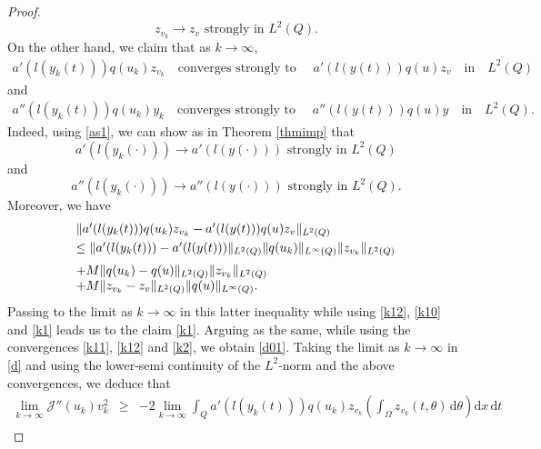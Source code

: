 \documentclass[reqno,twoside]{amsart}
\numberwithin{equation}{section}
\theoremstyle{definition}
\numberwithin{equation}{section}
\def \dis {\displaystyle}
\def \dq {\mathrm{d}x \, \mathrm{d}t}
\def \d {\mathrm{d}}
\begin{document}
\begin{proof}
\begin{equation}\label{k10}
	z_{v_k}\to z_{v}   \text{ strongly in }  L^2(Q).
\end{equation}
On the other hand, we claim that as $k\to \infty$,
\begin{equation}\label{d0}
	\begin{array}{lllll}
		a'(l(y_k(t)))q(u_k)z_{v_k} \quad \text{converges strongly to }\quad a'(l(y(t)))q(u)z_{v}\quad \text{in}\quad L^2(Q)
	\end{array}
\end{equation}
and
\begin{equation}\label{d01}
	\begin{array}{lllll}
		a''(l(y_k(t)))q(u_k)y_{k} \quad \text{converges strongly to }\quad a''(l(y(t)))q(u)y\quad \text{in}\quad L^2(Q).
	\end{array}
\end{equation}
Indeed, using \eqref{as1}, we can show as in Theorem \ref{thmimp} that
\begin{equation}\label{k1}
	a'(l(y_k(\cdot)))\to a'(l(y(\cdot)))   \text{ strongly in }  L^2(Q)
\end{equation}
and
\begin{equation}\label{k2}
	a''(l(y_k(\cdot)))\to a''(l(y(\cdot)))   \text{ strongly in }  L^2(Q).
\end{equation}
Moreover, we  have
\begin{equation*}
	\begin{array}{lllll}
		\smallskip
		\|a'(l(y_k(t)))q(u_k)z_{v_k} - a'(l(y(t)))q(u)z_{v}\|_{L^2(Q)}\\
		\smallskip
		\leq \|a'(l(y_k(t))) - a'(l(y(t)))\|_{L^2(Q)}\|q(u_k)\|_{L^\infty(Q)}
		\smallskip \|z_{v_k}\|_{L^2(Q)}\\
		+M\|q(u_k)-q(u)\|_{L^2(Q)}\|z_{v_k}\|_{L^2(Q)}\\
		+M\|z_{v_k} -z_{v}\|_{L^2(Q)}\|q(u)\|_{L^\infty(Q)}.
	\end{array}
\end{equation*}
Passing to the limit as $k\to \infty$ in this latter inequality while using \eqref{k12}, \eqref{k10} and \eqref{k1} leads us to the claim \eqref{k1}. Arguing as the same, while using the convergences \eqref{k11}, \eqref{k12} and \eqref{k2}, we obtain \eqref{d01}.
Taking the limit as $k\to \infty$ in \eqref{d} and using the lower-semi continuity of the $L^2$-norm and the above convergences,  we deduce that
\begin{eqnarray*}
	\dis \lim_{k\to \infty}  \mathcal{J}''(u_k)v_k^2
	&\geq&\dis -2\lim_{k\to \infty}\int_{Q}a'(l(y_k(t)))q(u_k)z_{v_k}\left(\int_{\Omega}z_{v_k}(t,\theta)\,\d \theta\right)\dq\\

\end{eqnarray*}
\end{proof}
\end{document}
